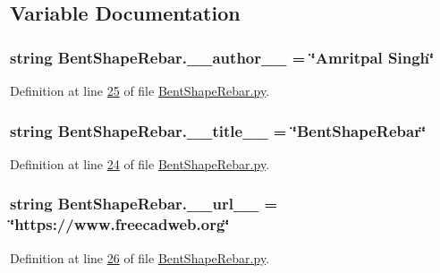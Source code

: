 \subsection{Variable Documentation}
\subsubsection[{\texorpdfstring{\+\_\+\+\_\+author\+\_\+\+\_\+}{__author__}}]{\setlength{\rightskip}{0pt plus 5cm}string Bent\+Shape\+Rebar.\+\_\+\+\_\+author\+\_\+\+\_\+ = \char`\"{}Amritpal Singh\char`\"{}\hspace{0.3cm}{\ttfamily [private]}}\hypertarget{namespaceBentShapeRebar_ad79a2dbf88601c24aae561033cb48d34}{}\label{namespaceBentShapeRebar_ad79a2dbf88601c24aae561033cb48d34}


Definition at line \hyperlink{BentShapeRebar_8py_source_l00025}{25} of file \hyperlink{BentShapeRebar_8py_source}{Bent\+Shape\+Rebar.\+py}.

\subsubsection[{\texorpdfstring{\+\_\+\+\_\+title\+\_\+\+\_\+}{__title__}}]{\setlength{\rightskip}{0pt plus 5cm}string Bent\+Shape\+Rebar.\+\_\+\+\_\+title\+\_\+\+\_\+ = \char`\"{}Bent\+Shape\+Rebar\char`\"{}\hspace{0.3cm}{\ttfamily [private]}}\hypertarget{namespaceBentShapeRebar_a38b223debc1826fd2855773a02749bb4}{}\label{namespaceBentShapeRebar_a38b223debc1826fd2855773a02749bb4}


Definition at line \hyperlink{BentShapeRebar_8py_source_l00024}{24} of file \hyperlink{BentShapeRebar_8py_source}{Bent\+Shape\+Rebar.\+py}.

\subsubsection[{\texorpdfstring{\+\_\+\+\_\+url\+\_\+\+\_\+}{__url__}}]{\setlength{\rightskip}{0pt plus 5cm}string Bent\+Shape\+Rebar.\+\_\+\+\_\+url\+\_\+\+\_\+ = \char`\"{}https\+://www.\+freecadweb.\+org\char`\"{}\hspace{0.3cm}{\ttfamily [private]}}\hypertarget{namespaceBentShapeRebar_aec768ca6a259d1cc738ea11c79a124e2}{}\label{namespaceBentShapeRebar_aec768ca6a259d1cc738ea11c79a124e2}


Definition at line \hyperlink{BentShapeRebar_8py_source_l00026}{26} of file \hyperlink{BentShapeRebar_8py_source}{Bent\+Shape\+Rebar.\+py}.

